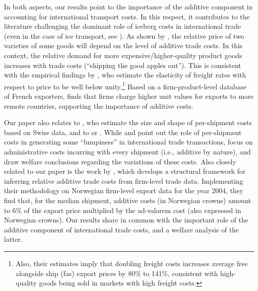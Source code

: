 \documentclass[a4paper,11pt]{article}
\begin{document}
\smallskip
In both aspects, our results point to the importance of the additive component in accounting for international transport costs.
In this respect, it contributes to the literature challenging the dominant role of iceberg costs in international trade (even in the case of ice transport, see \citealp{bosker2018ice}). As shown by \cite{alchian}, the relative price of two varieties of some goods will depend on the level of additive trade costs. In this context, the relative demand for more expensive/higher-quality product goods increases with trade costs (``shipping the good apples out''). This is consistent with the empirical findings by \cite{hummels_skiba}, who estimate the elasticity of freight rates with respect to price to be well below unity.\footnote{Also, their estimates imply that doubling freight costs increases average free alongside ship (fas) export prices by 80\% to 141\%, consistent with high-quality goods being sold in markets with high freight costs.}
Based on a firm-product-level database of French exporters, \cite{martin2012} finds that firms charge higher unit values for exports to more remote countries, supporting the importance of additive costs.

Our paper also relates to \cite{Kropf-Saure-JIE-2016}, who estimate the size and shape of per-shipment costs based on Swiss data, and to \cite{Alessandria-et-al-AER-2010} or \cite{Hornok-et-al-RES-2015, Hornok-et-al-JIE-2015}. While \cite{Alessandria-et-al-AER-2010}  and \cite{Hornok-et-al-RES-2015} point out the role of per-shipment costs in generating some ``lumpiness'' in international trade transactions, \cite{Hornok-et-al-JIE-2015} focus on administrative costs incurring with every shipment (i.e., additive by nature), and draw welfare conclusions regarding the variations of these costs. Also closely related to our paper is the work by \cite{Irrazabal_2015}, which develops a structural framework for inferring relative additive trade costs from firm-level trade data. Implementing their methodology on Norwegian firm-level export data for the year 2004, they find that, for the median shipment, additive costs (in Norwegian crowns) amount to 6\% of the export price multiplied by the ad-valorem cost (also expressed in Norwegian crowns). Our results share in common with \cite{Irrazabal_2015} the important role of the additive component of international trade costs, and a welfare analysis of the latter.
\end{document}
